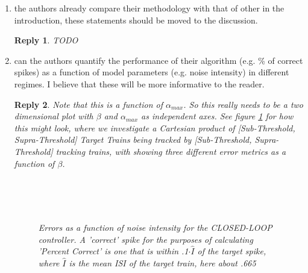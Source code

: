 \documentclass{article}
\newtheorem*{rep}{Reply}
\begin{document}
\begin{enumerate}
\item the authors already compare their methodology with that of other in the
introduction, these statements should be moved to the discussion.
\begin{rep}
TODO
\end{rep}

\item can the authors quantify the performance of their algorithm (e.g. \% of
correct spikes) as a function of model parameters (e.g. noise intensity) in
different regimes. I believe that these will be more informative to the reader.
\begin{rep}
Note that this is a function of $\alpha_{max}$. So this really needs to be a two
dimensional plot with $\beta$ and $\alpha_{max}$ as independent axes.
See figure \ref{fig:target_error_as_func_of_beta} for how this might look,
where we investigate a Cartesian product of [Sub-Threshold, Supra-Threshold]
Target Trains being tracked by [Sub-Threshold, Supra-Threshold] tracking
trains, with showing three different error metrics as a function of $\beta$.
\begin{figure}[htp] 
\begin{center}
\\
  \\
\\
  \caption[labelInTOC]{Errors as a function of noise intensity for the
  CLOSED-LOOP controller. A 'correct' spike for the purposes of calculating
  'Percent Correct' is one that is within .1$\cdot \hat I$ of the target spike, where $\hat I$ is the mean ISI of
 the target train, here about .665}
  \label{fig:target_error_as_func_of_beta}
\end{center}
\end{figure} 
\end{rep}
\end{enumerate}
\end{document}
